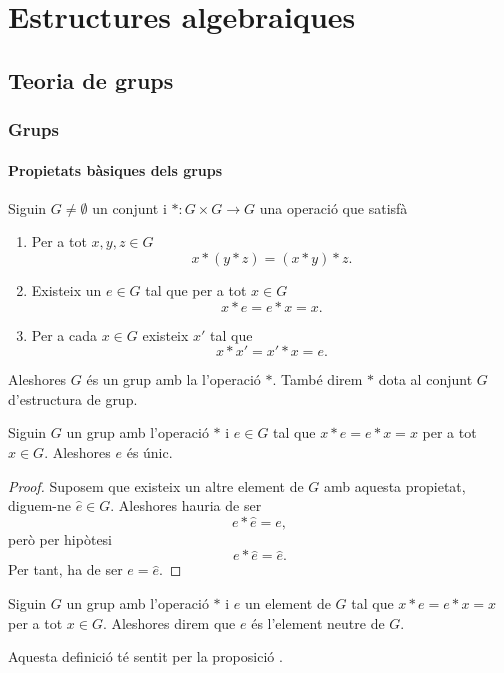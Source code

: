 \documentclass[../../Main.tex]{subfiles}
\begin{document}
\part{Estructures algebraiques}
\chapter{Teoria de grups}
\section{Grups}
	\subsection{Propietats bàsiques dels grups}
	\begin{definition}[Grup]
		\label{def:grup}
		Siguin \(G\neq\emptyset\) un conjunt i \(\ast\colon G\times G\to G\) una operació que satisfà
		\begin{enumerate}
			\item Per a tot \(x,y,z\in G\)
			\[x\ast(y\ast z)=(x\ast y)\ast z.\]
			\item Existeix un \(e\in G\) tal que per a tot \(x\in G\)
			\[x\ast e=e\ast x=x.\]
			\item Per a cada \(x\in G\) existeix \(x'\) tal que
			\[x\ast x'=x'\ast x=e.\]
		\end{enumerate}
		Aleshores \(G\) és un grup amb la l'operació \(\ast\). També direm \(\ast\) dota al conjunt \(G\) d'estructura de grup.
	\end{definition}
	\begin{proposition}
		\label{prop:unicitat neutre del grup}
		Siguin \(G\) un grup amb l'operació \(\ast\) i \(e\in G\) tal que \(x\ast e=e\ast x=x\) per a tot \(x\in G\). Aleshores \(e\) és únic.
		\begin{proof}
			Suposem que existeix un altre element de \(G\) amb aquesta propietat, diguem-ne \(\hat{e}\in G\). Aleshores hauria de ser
			\[e\ast\hat{e}=e,\]
			però per hipòtesi
			\[e\ast\hat{e}=\hat{e}.\]
			Per tant, ha de ser \(e=\hat{e}\).
		\end{proof}
	\end{proposition}
	\begin{definition}
		\label{def:l'element neutre del grup}
		Siguin \(G\) un grup amb l'operació \(\ast\) i \(e\) un element de \(G\) tal que \(x\ast e=e\ast x=x\) per a tot \(x\in G\). Aleshores direm que \(e\) és l'element neutre de \(G\).
		
		Aquesta definició té sentit per la proposició .
	\end{definition}
\end{document}

